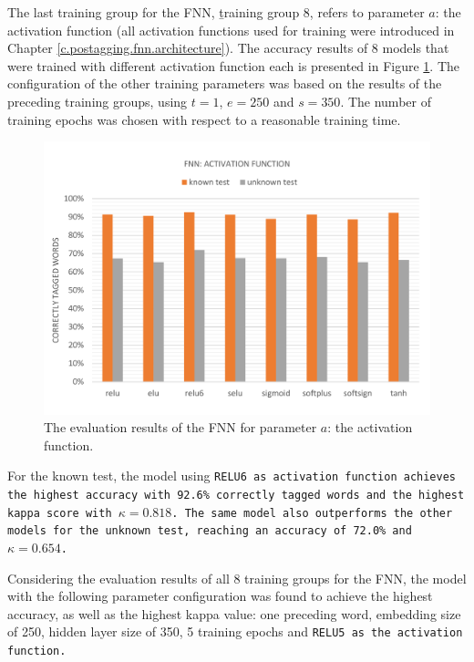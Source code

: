 The last training group for the FNN, \b{training group 8}, refers to parameter $a$: the activation function (all activation functions used for training were introduced in Chapter \ref{c.postagging.fnn.architecture}). The accuracy results of 8 models that were trained with different activation function each is presented in Figure \ref{f.evaluation.fnn.a}. The configuration of the other training parameters was based on the results of the preceding training groups, using $t=1$, $e=250$ and $s=350$. The number of training epochs was chosen with respect to a reasonable training time.

\begin{figure}[H]
	\hspace{-5mm}\includegraphics[width=1.07\textwidth]{images/evaluation_fnn_a}
	\caption[FNN Evaluation: Activation Function]{The evaluation results of the FNN for parameter $a$: the activation function.}
	\label{f.evaluation.fnn.a}
\end{figure}

For the known test, the model using \tt{RELU6} as activation function achieves the highest accuracy with 92.6\% correctly tagged words and the highest kappa score with $\kappa=0.818$. The same model also outperforms the other models for the unknown test, reaching an accuracy of 72.0\% and $\kappa=0.654$.

Considering the evaluation results of all 8 training groups for the FNN, the model with the following parameter configuration was found to achieve the highest accuracy, as well as the highest kappa value: one preceding word, embedding size of 250, hidden layer size of 350, 5 training epochs and \tt{RELU5} as the activation function.

